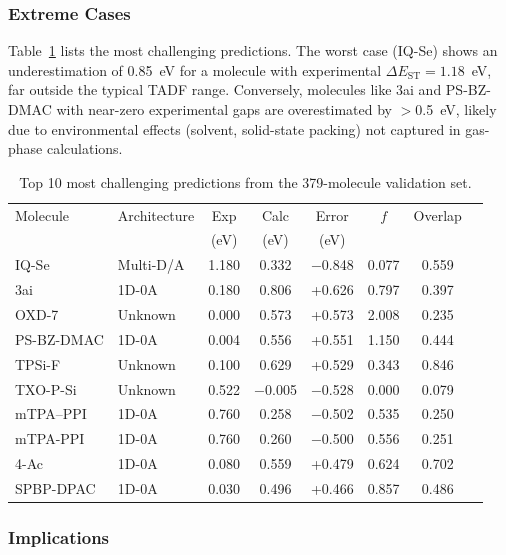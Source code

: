 \subsubsection{Extreme Cases}

Table~\ref{tab:SI_extreme_outliers} lists the most challenging predictions. The worst case (IQ-Se) shows an underestimation of 0.85~eV for a molecule with 
experimental $\Delta E_{\mathrm{ST}} = 1.18$~eV, far outside the typical TADF range. Conversely, molecules like 3ai and PS-BZ-DMAC with near-zero experimental 
gaps are overestimated by $>$0.5~eV, likely due to environmental effects (solvent, solid-state packing) not captured in gas-phase calculations.

\begin{table}[!ht]
\centering
\caption{Top 10 most challenging predictions from the 379-molecule validation set.}
\label{tab:SI_extreme_outliers}
\small
\begin{tabular}{llcccccc}
\hline
Molecule & Architecture & Exp & Calc & Error & $f$ & Overlap \\
         &              & (eV) & (eV) & (eV) &     &         \\
\hline
IQ-Se & Multi-D/A & 1.180 & 0.332 & $-$0.848 & 0.077 & 0.559 \\
3ai & 1D-0A & 0.180 & 0.806 & +0.626 & 0.797 & 0.397 \\
OXD-7 & Unknown & 0.000 & 0.573 & +0.573 & 2.008 & 0.235 \\
PS-BZ-DMAC & 1D-0A & 0.004 & 0.556 & +0.551 & 1.150 & 0.444 \\
TPSi-F & Unknown & 0.100 & 0.629 & +0.529 & 0.343 & 0.846 \\
TXO-P-Si & Unknown & 0.522 & $-$0.005 & $-$0.528 & 0.000 & 0.079 \\
mTPA–PPI & 1D-0A & 0.760 & 0.258 & $-$0.502 & 0.535 & 0.250 \\
mTPA-PPI & 1D-0A & 0.760 & 0.260 & $-$0.500 & 0.556 & 0.251 \\
4-Ac & 1D-0A & 0.080 & 0.559 & +0.479 & 0.624 & 0.702 \\
SPBP-DPAC & 1D-0A & 0.030 & 0.496 & +0.466 & 0.857 & 0.486 \\
\hline
\end{tabular}
\end{table}

\subsubsection{Implications}

